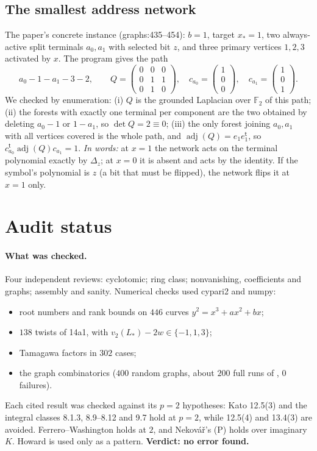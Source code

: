 \documentclass[11pt]{article}
\theoremstyle{remark}
\newcommand{\F}{\mathbb F}
\DeclareMathOperator{\adj}{adj}
\newcommand{\src}[2]{\textsf{\small #1:#2}}
\begin{document}
\subsection{The smallest address network}
The paper's concrete instance (\src{graphs}{435--454}): $b=1$, target $x_*=1$,
two always-active split terminals $a_0,a_1$ with selected bit $z$, and three
primary vertices $1,2,3$ activated by $x$. The program gives the path
\[
 a_0 - 1 - a_1 - 3 - 2,\qquad
 Q=\begin{pmatrix}0&0&0\\0&1&1\\0&1&0\end{pmatrix},\quad
 c_{a_0}=\begin{pmatrix}1\\0\\0\end{pmatrix},\quad
 c_{a_1}=\begin{pmatrix}1\\0\\1\end{pmatrix}.
\]
We checked by enumeration: (i) $Q$ is the grounded Laplacian over $\F_2$ of
this path; (ii) the forests with exactly one terminal per component are the
two obtained by deleting $a_0\!-\!1$ or $1\!-\!a_1$, so $\det Q=2\equiv0$;
(iii) the only forest joining $a_0,a_1$ with all vertices covered is the
whole path, and $\adj(Q)=e_1e_1^{\mathsf t}$, so
$c_{a_0}^{\mathsf t}\adj(Q)c_{a_1}=1$. \emph{In words:} at $x=1$ the network
acts on the terminal polynomial exactly by $\Delta_z$; at $x=0$ it is absent
and acts by the identity. If the symbol's polynomial is $z$ (a bit that must
be flipped), the network flips it at $x=1$ only.

\section{Audit status}
\label{sec:audit}

\paragraph{What was checked.} Four independent reviews: cyclotomic;
ring class; nonvanishing, coefficients and graphs; assembly and sanity.
Numerical checks used cypari2 and numpy:
\begin{itemize}
\item root numbers and rank bounds on $446$ curves $y^2=x^3+ax^2+bx$;
\item $138$ twists of 14a1, with $v_2(L_*)-2w\in\{-1,1,3\}$;
\item Tamagawa factors in $302$ cases;
\item the graph combinatorics ($400$ random graphs, about $200$ full runs of
 , $0$ failures).
\end{itemize}
Each cited result was checked against its $p=2$ hypotheses: Kato 12.5(3)
and the integral classes 8.1.3, 8.9--8.12 and 9.7 hold at $p=2$, while
12.5(4) and 13.4(3) are avoided. Ferrero--Washington holds at $2$, and
Nekov\'a\v{r}'s (P) holds over imaginary $K$. Howard is used only as a
pattern. \textbf{Verdict: no error found.}
\end{document}
